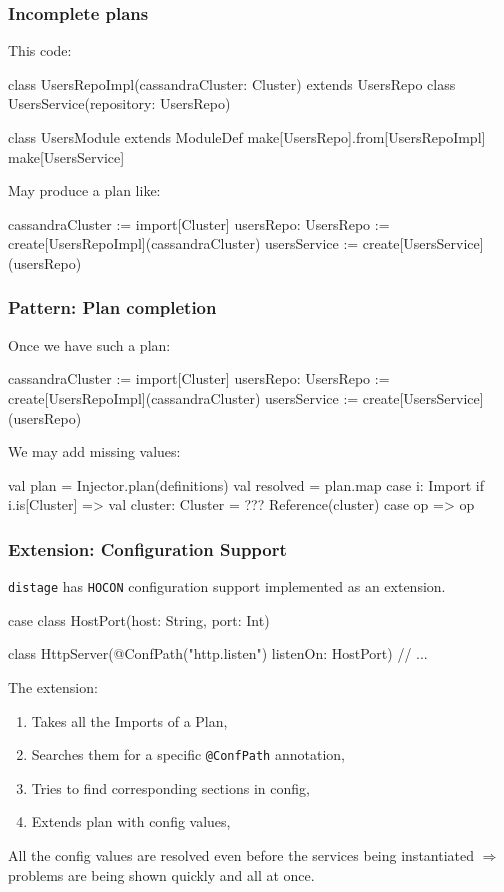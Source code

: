 \documentclass[usenames,dvipsnames]{beamer}
\newcommand{\distage}{\texttt{distage}\xspace}
\begin{document}
\begin{frame}[fragile]
\frametitle{Incomplete plans}
This code: 
\begin{scalacode}
class UsersRepoImpl(cassandraCluster: Cluster) 
    extends UsersRepo
class UsersService(repository: UsersRepo)

class UsersModule extends ModuleDef {
  make[UsersRepo].from[UsersRepoImpl]
  make[UsersService]
}
\end{scalacode}

May produce a plan like:
\begin{textcode}
cassandraCluster     := import[Cluster]
usersRepo: UsersRepo := create[UsersRepoImpl](cassandraCluster)
usersService         := create[UsersService](usersRepo)
\end{textcode}
\end{frame}

\begin{frame}[fragile]
\frametitle{Pattern: Plan completion}
Once we have such a plan:
\begin{textcode}
cassandraCluster     := import[Cluster]
usersRepo: UsersRepo := create[UsersRepoImpl](cassandraCluster)
usersService         := create[UsersService](usersRepo)
\end{textcode}

We may add missing values\footnotemark[1]:

\begin{scalacode}
val plan = Injector.plan(definitions)
val resolved = plan.map {
  case i: Import if i.is[Cluster] => 
    val cluster: Cluster = ???
    Reference(cluster)
  case op => op
}
\end{scalacode}
\end{frame}


\begin{frame}[fragile]
\frametitle{Extension: Configuration Support}

\distage has \texttt{HOCON} configuration support implemented as an extension.

\begin{scalacode}
case class HostPort(host: String, port: Int)

class HttpServer(@ConfPath("http.listen") listenOn: HostPort) {
  // ...
}
\end{scalacode}

The extension:
\begin{enumerate}
\item Takes all the Imports of a Plan,
\item Searches them for a specific \texttt{@ConfPath} annotation,
\item Tries to find corresponding sections in config,
\item Extends plan with config values,
\end{enumerate}
All the config values are resolved even before the services being instantiated $\Rightarrow$ problems are being shown quickly and all at once.
\end{frame}
\end{document}
